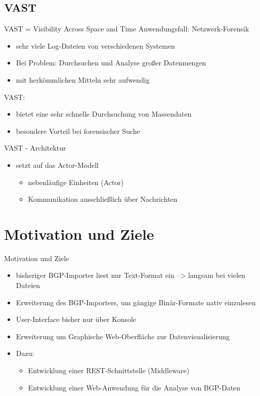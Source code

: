 \documentclass[9pt]{beamer}
\begin{document}
\subsection{VAST}

\begin{frame}{VAST = Visibility Across Space and Time}{}
	Anwendungsfall: Netzwerk-Forensik
	\begin{itemize}
		\item sehr viele Log-Dateien von verschiedenen Systemen
		\item Bei Problem: Durchsuchen und Analyse großer Datenmengen
		\item mit herkömmlichen Mitteln sehr aufwendig
	\end{itemize}
	VAST:
	\begin{itemize}
		\item bietet eine sehr schnelle Durchsuchung von Massendaten
		\item besondere Vorteil bei forensischer Suche
	\end{itemize}
\end{frame}

\begin{frame}{VAST - Architektur}{}
	\begin{itemize}
		\item setzt auf das Actor-Modell
		\begin{itemize}
			\item nebenläufige Einheiten (Actor)
			\item Kommunikation ausschließlich über Nachrichten
		\end{itemize}
	\end{itemize}
\end{frame}


\section{Motivation und Ziele}

\begin{frame}{Motivation und Ziele}{}
	\begin{itemize}
		\item bisheriger BGP-Importer liest nur Text-Format ein --> langsam bei vielen Dateien
		\item Erweiterung des BGP-Importers, um gängige Binär-Formate nativ einzulesen
		\item User-Interface bisher nur über Konsole
		\item Erweiterung um Graphische Web-Oberfläche zur Datenvisualisierung
		\item Dazu:
		\begin{itemize}
			\item Entwicklung einer REST-Schnittstelle (Middleware)
			\item Entwicklung einer Web-Anwendung für die Analyse von BGP-Daten
		\end{itemize}
	\end{itemize}
\end{frame}
\end{document}
